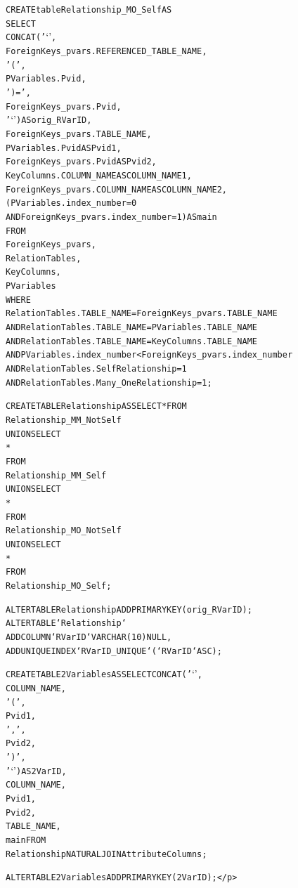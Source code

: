 \begin{appendix}
\begin{scriptsize}
\begin{alltt}
CREATE table Relationship_MO_Self AS
SELECT 
    CONCAT('`',
            ForeignKeys_pvars.REFERENCED_TABLE_NAME,
            '(',
            PVariables.Pvid,
            ')=',
            ForeignKeys_pvars.Pvid,
            '`') AS orig_RVarID,
    ForeignKeys_pvars.TABLE_NAME,
    PVariables.Pvid AS Pvid1,
    ForeignKeys_pvars.Pvid AS Pvid2,
    KeyColumns.COLUMN_NAME AS COLUMN_NAME1,
    ForeignKeys_pvars.COLUMN_NAME AS COLUMN_NAME2,
    (PVariables.index_number = 0
        AND ForeignKeys_pvars.index_number = 1) AS main
FROM
    ForeignKeys_pvars,
    RelationTables,
    KeyColumns,
    PVariables
WHERE
    RelationTables.TABLE_NAME = ForeignKeys_pvars.TABLE_NAME
        AND RelationTables.TABLE_NAME = PVariables.TABLE_NAME
        AND RelationTables.TABLE_NAME = KeyColumns.TABLE_NAME
AND PVariables.index_number < ForeignKeys_pvars.index_number
        AND RelationTables.SelfRelationship = 1
        AND RelationTables.Many_OneRelationship = 1;

CREATE TABLE Relationship AS SELECT * FROM  
Relationship_MM_NotSelf    
UNION SELECT            
*                   
FROM
Relationship_MM_Self 
UNION SELECT 
*
FROM
Relationship_MO_NotSelf 
UNION SELECT 
*
FROM
Relationship_MO_Self;

ALTER TABLE Relationship ADD PRIMARY KEY (orig_RVarID);
ALTER TABLE `Relationship` 
ADD COLUMN `RVarID` VARCHAR(10) NULL , 
ADD UNIQUE INDEX `RVarID_UNIQUE` (`RVarID` ASC) ; 


CREATE TABLE 2Variables AS SELECT CONCAT('`',
        COLUMN_NAME,
        '(',
        Pvid1,
        ',',
        Pvid2,
        ')',
        '`') AS 2VarID,
COLUMN_NAME,
Pvid1,
Pvid2,
TABLE_NAME,
main FROM
Relationship    NATURAL JOIN  AttributeColumns;

ALTER TABLE 2Variables ADD PRIMARY KEY (2VarID);</p>\end{alltt}


\end{scriptsize}



\end{appendix}




